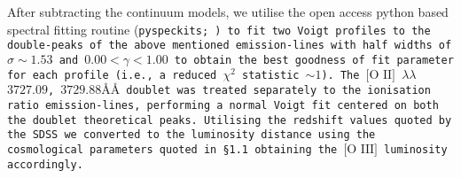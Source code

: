 After subtracting the continuum models, we utilise the open access python based spectral fitting routine (\tt{pyspeckits}; \cite{2011ascl.soft09001G}) to fit two Voigt profiles to the double-peaks of the above mentioned emission-lines with half widths of $\sigma\sim{1.53}$ and ${0.00}<{\gamma}<{1.00}$ to obtain the best goodness of fit parameter for each profile (i.e., a reduced $\chi^{2}$ statistic $\sim{1}$). The $\text{[O II]}$ $\lambda\lambda$$3727.09$, $3729.88ÅÅ$ doublet was treated separately to the ionisation ratio emission-lines, performing a normal Voigt fit centered on both the doublet theoretical peaks. Utilising the redshift values quoted by the SDSS we converted to the luminosity distance using the cosmological parameters quoted in §1.1 obtaining the $\text{[O III]}$ luminosity accordingly.
  